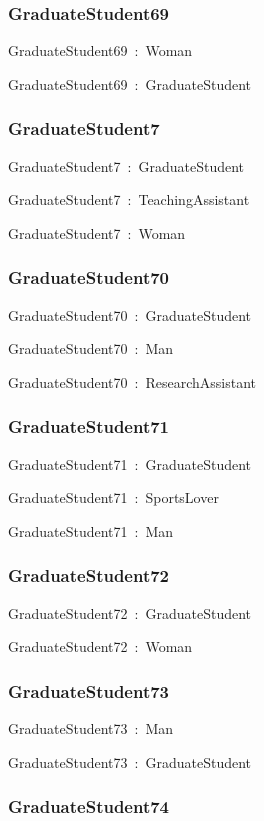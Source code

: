 \documentclass{article}
\begin{document}
\subsubsection*{GraduateStudent69}

GraduateStudent69~:~Woman

GraduateStudent69~:~GraduateStudent

\subsubsection*{GraduateStudent7}

GraduateStudent7~:~GraduateStudent

GraduateStudent7~:~TeachingAssistant

GraduateStudent7~:~Woman

\subsubsection*{GraduateStudent70}

GraduateStudent70~:~GraduateStudent

GraduateStudent70~:~Man

GraduateStudent70~:~ResearchAssistant

\subsubsection*{GraduateStudent71}

GraduateStudent71~:~GraduateStudent

GraduateStudent71~:~SportsLover

GraduateStudent71~:~Man

\subsubsection*{GraduateStudent72}

GraduateStudent72~:~GraduateStudent

GraduateStudent72~:~Woman

\subsubsection*{GraduateStudent73}

GraduateStudent73~:~Man

GraduateStudent73~:~GraduateStudent

\subsubsection*{GraduateStudent74}
\end{document}
